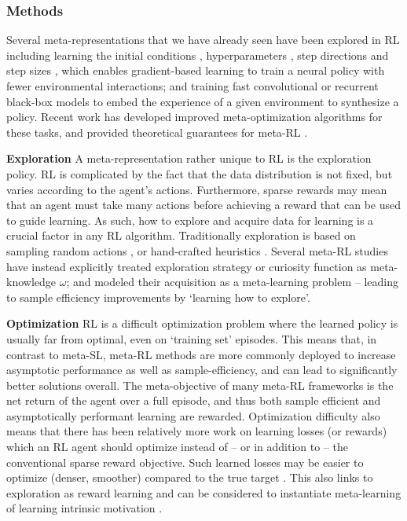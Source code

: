 \documentclass[10pt,journal,compsoc]{IEEEtran}
\newcommand{\keypoint}[1]{\vspace{0.1cm}\noindent\textbf{#1}\quad}
\begin{document}
\subsubsection{Methods}
Several meta-representations that we have already seen have been explored in RL including learning the initial conditions \cite{finn2017maml,fernando2018baldwinmeta}, hyperparameters \cite{jaderberg2019poprl,fernando2018baldwinmeta}, step directions \cite{li2017meta} and step sizes \cite{young2019metaac}, which enables gradient-based learning to train a neural policy with fewer environmental interactions; and training fast convolutional \cite{mishra2017simple} or recurrent \cite{duan2016fastslowrl,wang2016l2rl} black-box models to embed the experience of a given environment to synthesize a policy.
Recent work has developed improved meta-optimization algorithms \cite{song2019esmaml,rothfuss2019promp,liu2019tamingmaml} for these tasks, and provided theoretical guarantees for meta-RL \cite{fallah2020provably}.


\keypoint{Exploration}
A meta-representation rather unique to RL is the exploration policy. RL is complicated by the fact that the data distribution is not fixed, but varies according to the agent's actions. Furthermore, sparse rewards may mean that an agent must take many actions before achieving a reward that can be used to guide learning. As such, how to explore and acquire data for learning is a crucial factor in any RL algorithm. Traditionally exploration is based on sampling random actions \cite{schulman2017ppo}, or hand-crafted heuristics \cite{sigaud2019policy}. Several meta-RL studies have instead explicitly treated exploration strategy or curiosity function as meta-knowledge $\omega$; and modeled their acquisition as a meta-learning problem \cite{schmidhuber1997s,garcia2019metamdp,stadie2018metaexplore,alet2020metacuriosity} -- leading to  sample efficiency improvements by `learning how to explore'.

\keypoint{Optimization}
RL is a difficult optimization problem where the learned policy is usually far from optimal, even on `training set' episodes. This means that, in contrast to meta-SL, meta-RL methods are more commonly deployed to increase asymptotic  performance \cite{jaderberg2019poprl,houthooft2018epg,veeriah2019discovery} as well as sample-efficiency, and can lead to significantly better solutions overall. The meta-objective of many meta-RL frameworks is the net return of the agent over a full episode, and thus both sample efficient and asymptotically performant learning are rewarded.
Optimization difficulty also means that there has been relatively more work on learning losses (or rewards) \cite{veeriah2019discovery,zhou2020online,kirsch2020improving,bechtle2019metaLoss} which an RL agent should optimize instead of -- or in addition to -- the conventional sparse reward objective. Such learned losses may be easier to optimize (denser, smoother) compared to the true target \cite{houthooft2018epg,kirsch2020improving}. This also links to exploration as reward learning and can be considered to instantiate meta-learning of learning intrinsic motivation \cite{zheng2018intrinsicrewardpg}.
\end{document}
